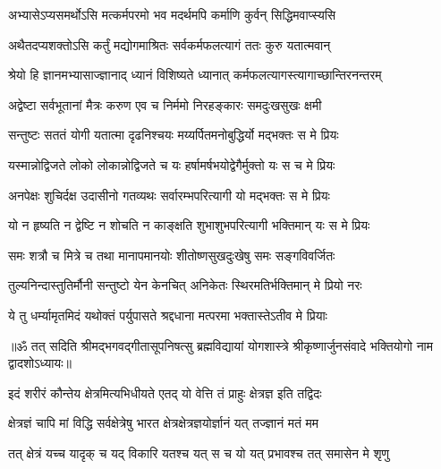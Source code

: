 \twolineshloka
{अभ्यासेऽप्यसमर्थोऽसि मत्कर्मपरमो भव}
{मदर्थमपि कर्माणि कुर्वन् सिद्धिमवाप्स्यसि}%

\twolineshloka
{अथैतदप्यशक्तोऽसि कर्तुं मद्योगमाश्रितः}
{सर्वकर्मफलत्यागं ततः कुरु यतात्मवान्}%

\twolineshloka
{श्रेयो हि ज्ञानमभ्यासाज्ज्ञानाद्‌ ध्यानं विशिष्यते}
{ध्यानात् कर्मफलत्यागस्त्यागाच्छान्तिरनन्तरम्}%

\twolineshloka
{अद्वेष्टा सर्वभूतानां मैत्रः करुण एव च}
{निर्ममो निरहङ्कारः समदुःखसुखः क्षमी}%

\twolineshloka
{सन्तुष्टः सततं योगी यतात्मा दृढनिश्चयः}
{मय्यर्पितमनोबुद्धिर्यो मद्भक्तः स मे प्रियः}%

\twolineshloka
{यस्मान्नोद्विजते लोको लोकान्नोद्विजते च यः}
{हर्षामर्षभयोद्वेगैर्मुक्तो यः स च मे प्रियः}%

\twolineshloka
{अनपेक्षः शुचिर्दक्ष उदासीनो गतव्यथः}
{सर्वारम्भपरित्यागी यो मद्भक्तः स मे प्रियः}%

\twolineshloka
{यो न हृष्यति न द्वेष्टि न शोचति न काङ्क्षति}
{शुभाशुभपरित्यागी भक्तिमान् यः स मे प्रियः}%

\twolineshloka
{समः शत्रौ च मित्रे च तथा मानापमानयोः}
{शीतोष्णसुखदुःखेषु समः सङ्गविवर्जितः}%

\twolineshloka
{तुल्यनिन्दास्तुतिर्मौनी सन्तुष्टो येन केनचित्}
{अनिकेतः स्थिरमतिर्भक्तिमान् मे प्रियो नरः}%

\twolineshloka
{ये तु धर्म्यामृतमिदं यथोक्तं पर्युपासते}
{श्रद्दधाना मत्परमा भक्तास्तेऽतीव मे प्रियाः}%

{॥ॐ तत् सदिति श्रीमद्भगवद्गीतासूपनिषत्सु ब्रह्मविद्यायां योगशास्त्रे श्रीकृष्णार्जुनसंवादे भक्तियोगो नाम द्वादशोऽध्यायः॥}





\twolineshloka
{इदं शरीरं कौन्तेय क्षेत्रमित्यभिधीयते}
{एतद् यो वेत्ति तं प्राहुः क्षेत्रज्ञ इति तद्विदः}%

\twolineshloka
{क्षेत्रज्ञं चापि मां विद्धि सर्वक्षेत्रेषु भारत}
{क्षेत्रक्षेत्रज्ञयोर्ज्ञानं यत् तज्ज्ञानं मतं मम}%

\twolineshloka
{तत् क्षेत्रं यच्च यादृक् च यद् विकारि यतश्च यत्}
{स च यो यत् प्रभावश्च तत् समासेन मे शृणु}%

